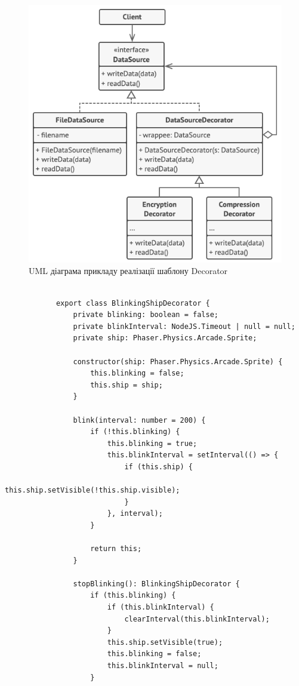 \documentclass[oneside,14pt]{extarticle}
\begin{document}
\begin{normalsize}
		\begin{figure}[H]
		\centering
		\includegraphics[width=\textwidth]{decorator-ex}
		\caption{UML діаграма прикладу реалізації шаблону Decorator}
	\end{figure}
	
	\begin{small}
		\begin{lstlisting}
			
			export class BlinkingShipDecorator {
				private blinking: boolean = false;
				private blinkInterval: NodeJS.Timeout | null = null;
				private ship: Phaser.Physics.Arcade.Sprite;
				
				constructor(ship: Phaser.Physics.Arcade.Sprite) {
					this.blinking = false;
					this.ship = ship;
				}
				
				blink(interval: number = 200) {
					if (!this.blinking) {
						this.blinking = true;
						this.blinkInterval = setInterval(() => {
							if (this.ship) {
								this.ship.setVisible(!this.ship.visible);
							}
						}, interval);
					}
					
					return this;
				}
				
				stopBlinking(): BlinkingShipDecorator {
					if (this.blinking) {
						if (this.blinkInterval) {
							clearInterval(this.blinkInterval);
						}
						this.ship.setVisible(true);
						this.blinking = false;
						this.blinkInterval = null;
					}
					

\end{lstlisting}
\end{small}
\end{normalsize}
\end{document}
